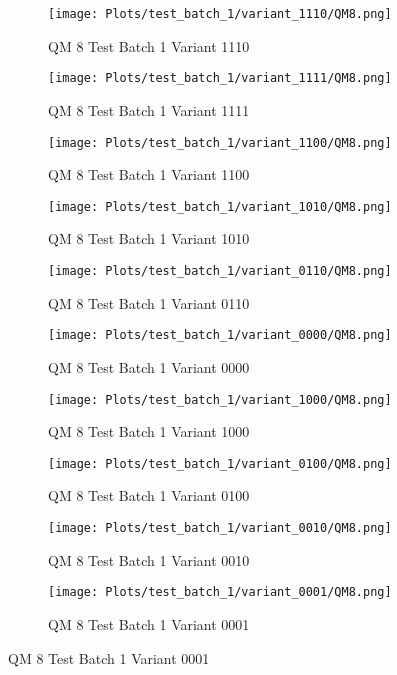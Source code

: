 \documentclass{DissertateFigs}
\begin{document}
\begin{figure}[t!]
    \begin{subfigure}{0.38\textwidth}
    \texttt{[image: Plots/test\_batch\_1/variant\_1110/QM8.png]}
    \caption{QM 8 Test Batch 1 Variant 1110}
    \end{subfigure}
    \begin{subfigure}{0.38\textwidth}
    \texttt{[image: Plots/test\_batch\_1/variant\_1111/QM8.png]}
    \caption{QM 8 Test Batch 1 Variant 1111}
    \end{subfigure}

\medskip

    \begin{subfigure}{0.38\textwidth}
    \texttt{[image: Plots/test\_batch\_1/variant\_1100/QM8.png]}
    \caption{QM 8 Test Batch 1 Variant 1100}
    \end{subfigure}
    \begin{subfigure}{0.38\textwidth}
    \texttt{[image: Plots/test\_batch\_1/variant\_1010/QM8.png]}
    \caption{QM 8 Test Batch 1 Variant 1010}
    \end{subfigure}

\medskip

    \begin{subfigure}{0.38\textwidth}
    \texttt{[image: Plots/test\_batch\_1/variant\_0110/QM8.png]}
    \caption{QM 8 Test Batch 1 Variant 0110}
    \end{subfigure}
    \begin{subfigure}{0.38\textwidth}
    \texttt{[image: Plots/test\_batch\_1/variant\_0000/QM8.png]}
    \caption{QM 8 Test Batch 1 Variant 0000}
    \end{subfigure}

\medskip

    \begin{subfigure}{0.38\textwidth}
    \texttt{[image: Plots/test\_batch\_1/variant\_1000/QM8.png]}
    \caption{QM 8 Test Batch 1 Variant 1000}
    \end{subfigure}
    \begin{subfigure}{0.38\textwidth}
    \texttt{[image: Plots/test\_batch\_1/variant\_0100/QM8.png]}
    \caption{QM 8 Test Batch 1 Variant 0100}
    \end{subfigure}

\medskip

    \begin{subfigure}{0.38\textwidth}
    \texttt{[image: Plots/test\_batch\_1/variant\_0010/QM8.png]}
    \caption{QM 8 Test Batch 1 Variant 0010}
    \end{subfigure}
    \begin{subfigure}{0.38\textwidth}
    \texttt{[image: Plots/test\_batch\_1/variant\_0001/QM8.png]}
    \caption{QM 8 Test Batch 1 Variant 0001}
    \end{subfigure}


\end{figure}
\end{document}
